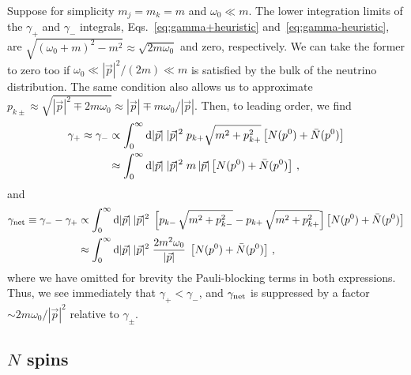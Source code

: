 \documentclass[aps,prd,10pt,twocolumn,superscriptaddress,floatfix,nofootinbib,amsmath,amssymb,altaffilletter,preprintnumbers]{revtex4-1}
\begin{document}
Suppose for simplicity $m_j = m_k=m$ and $\omega_0 \ll m$.  The lower integration limits of the $\gamma_+$ and $\gamma_-$ integrals, Eqs.~\eqref{eq:gamma+heuristic} and~\eqref{eq:gamma-heuristic}, are $\sqrt{(\omega_0+m)^2-m^2} \approx \sqrt{2 m\omega_0}$ and zero, respectively.  We can take the former to zero too if $\omega_0 \ll |\vec{p}|^2/(2 m) \ll m$ is satisfied by the bulk of the neutrino distribution.  The same condition also allows us to approximate $p_{k\pm} \approx \sqrt{ |\vec{p}|^2\mp 2m \omega_0}\approx|\vec{p}| \mp m\omega_0/|\vec{p}|$. Then, to leading order, we find 
\begin{equation}
\begin{aligned}
\gamma_+ \approx \gamma_- & \propto \int_0^\infty {\rm d}|\vec{p}|\; |\vec{p}|^2 \; p_{k+}\sqrt{m^2+p^2_{k+}}  \left[N(p^0) + \bar{N}(p^0)\right] \\
& \approx \int_0^\infty {\rm d}|\vec{p}|\; |\vec{p}|^2\;  m \, |\vec{p}|  \left[N(p^0) + \bar{N}(p^0)\right] \, ,
\end{aligned}
\end{equation}
and
\begin{equation}
\begin{aligned}
\gamma_{\rm net} \equiv \gamma_--\gamma_+&  \propto \int^\infty_0 {\rm d}|\vec{p}| \; |\vec{p}|^2\; \left[p_{k-}\, \sqrt{m^2+p^2_{k-}}- p_{k+}\, \sqrt{m^2+p^2_{k+}}
\right] \left[N(p^0) + \bar{N}(p^0)\right] \\
& \approx   \int^\infty_0 {\rm d}|\vec{p}| \; |\vec{p}|^2\; \frac{2 m^2 \omega_0}{|\vec{p}|} \; \left[N(p^0) + \bar{N}(p^0)\right] \, ,
\end{aligned}
\end{equation}
where we have omitted for brevity the Pauli-blocking terms in both expressions.  Thus, we see immediately that $\gamma_{+}< \gamma_-$, and $\gamma_{\rm net}$ is suppressed by a factor $\sim 2 m \omega_0/|\vec{p}|^2$ relative to $\gamma_\pm$.


\subsection{\texorpdfstring{$N$}{N} spins}
\end{document}

